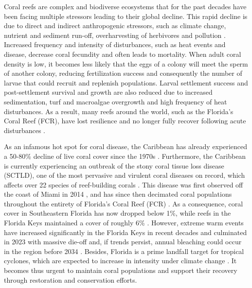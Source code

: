 \documentclass[preprint,12pt,authoryear]{elsarticle}
\begin{document}
Coral reefs are complex and biodiverse ecosystems that for the past decades have been facing multiple stressors leading to their global decline. This rapid decline is due to direct and indirect anthropogenic stressors, such as climate change, nutrient and sediment run-off, overharvesting of herbivores and pollution \citep{hughes2003climate, hughes2018spatial, hoegh2007coral, hoegh2017coral}. Increased frequency and intensity of disturbances, such as heat events and disease, decrease coral fecundity and often leads to mortality. When adult coral density is low, it becomes less likely that the eggs of a colony will meet the sperm of another colony, reducing fertilization success and consequently the number of larvae that could recruit and replenish populations. Larval settlement success and post-settlement survival and growth are also reduced due to increased sedimentation, turf and macroalgae overgrowth and high frequency of heat disturbances. As a result, many reefs around the world, such as the Florida’s Coral Reef (FCR), have lost resilience and no longer fully recover following acute disturbances \citep{jones2022frequent}.

As an infamous hot spot for coral disease, the Caribbean has already experienced a 50-80\% decline of live coral cover since the 1970s \citep{gardner2003long,jackson2014status}. Furthermore, the Caribbean is currently experiencing an outbreak of the stony coral tissue loss disease (SCTLD), one of the most pervasive and virulent coral diseases on record, which affects over 22 species of reef-building corals \citep{noaa2018,meiling2021variable}. This disease was first observed off the coast of Miami in 2014 \citep{precht2016unprecedented}, and has since then decimated coral populations throughout the entirety of Florida's Coral Reef (FCR) \citep{williams2021fine,frrp2021}. As a consequence, coral cover in Southeastern Florida has now dropped below 1\%, while reefs in the Florida Keys maintained a cover of roughly 6\% \citep{grove2022national}. However, extreme warm events have increased significantly in the Florida Keys in recent decades and culminated in 2023 with massive die-off and, if trends persist, annual bleaching could occur in the region before 2034 \citep{manzello2015rapid}. Besides, Florida is a prime landfall target for tropical cyclones, which are expected to increase in intensity under climate change \citep{dobbelaere2024hurricanes}. It becomes thus urgent to maintain coral populations and support their recovery through restoration and conservation efforts.
\end{document}
